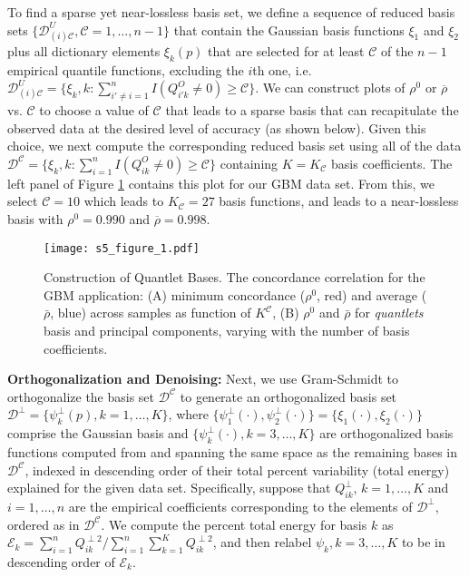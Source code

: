 \documentclass[11pt]{article}
\begin{document}
To find a sparse yet near-lossless basis set, we define a sequence of reduced basis sets $\{\mathcal{D}^U_{(i)\mathcal{C}}, \mathcal{C}=1, \ldots, n-1\}$ that contain the Gaussian basis functions $\xi_1$ and $\xi_2$ plus all dictionary elements $\xi_k(p)$ that are selected for at least $\mathcal{C}$ of the $n-1$ empirical quantile functions, excluding the $i$th one, i.e. $\mathcal{D}^U_{(i)\mathcal{C}}=\{\xi_k, k:\sum_{i' \ne i = 1}^n I(Q^O_{i'k} \ne 0) \ge \mathcal{C}\}.$ 
We can construct plots of $\rho^0$ or $\overline{\rho}$ vs. $\mathcal{C}$ to choose a value of $\mathcal{C}$ that leads to a sparse basis that can recapitulate the observed data at the desired level of accuracy (as shown below).  Given this choice, we next compute the corresponding reduced basis set using all of the data $\mathcal{D}^\mathcal{C}=\{\xi_k, k:\sum_{i = 1}^n I(Q^O_{ik} \ne 0) \ge \mathcal{C}\}$ containing $K=K_\mathcal{C}$ basis coefficients.  The left panel of Figure \ref{S5_Figure_qant} contains this plot for our GBM data set.  From this, we select $\mathcal{C}=10$ which leads to $K_\mathcal{C}=27$ basis functions, and leads to a near-lossless basis with $\rho^0=0.990$ and $\overline{\rho}=0.998$.
 \begin{figure}[!htb]
\centering
\caption{Construction of Quantlet Bases.  The concordance correlation for the GBM application: (A) minimum concordance
($\rho^{0}$, red) and average ($\bar\rho$, blue) across samples as function of $K^\mathcal{C}$,
(B) $\rho^{0}$ and $\bar\rho$ for {\it quantlets} basis and principal components, varying with the number of basis coefficients.  
  \label{S5_Figure_qant}}
\texttt{[image: s5\_figure\_1.pdf]}
\end{figure}

\textbf{Orthogonalization and Denoising:} 
Next, we use Gram-Schmidt to orthogonalize the basis set $\mathcal{D}^\mathcal{C}$ to generate an orthogonalized basis set $\mathcal{D}^{\perp}=\{\psi^\perp_k(p), k=1,\ldots,K\}$, where $\{\psi^\perp_1(\cdot), \psi^\perp_2(\cdot)\}=\{\xi_1(\cdot), \xi_2(\cdot)\}$ comprise the Gaussian basis and $\{\psi^\perp_k(\cdot), k=3,\ldots,K\}$ are orthogonalized basis functions computed from and spanning the same space as the remaining bases in $\mathcal{D}^\mathcal{C}$, indexed in descending order of their total percent variability (total energy) explained for the given data set. 
Specifically, suppose that $Q_{ik}^{\perp}$, $k= 1, \dots, K$ and $i=1, \dots, n$  are the empirical coefficients corresponding to the elements of $\mathcal{D}^\perp$, ordered as in $\mathcal{D}^{\mathcal{C}}$.
We compute the percent total energy for basis $k$ as  $\mathcal{E}_k=\sum_{i=1}^{n}Q_{ik}^{ \perp 2}/\sum_{i=1}^{n}\sum_{k=1}^{K}Q_{ik}^{\perp  2}$, and then relabel $\psi_k, k=3, \ldots, K$ to be in descending order of $\mathcal{E}_k$.
\end{document}

